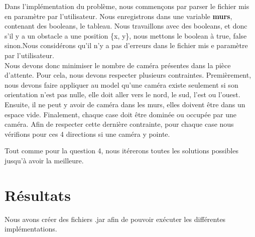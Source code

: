 \documentclass{article}
\begin{document}
Dans l'implémentation du problème, nous commençons par parser le fichier mis en paramètre par l'utilisateur. Nous enregistrons dans une variable \textbf{murs}, contenant des booleans, le tableau. Nous travaillons avec des booleans, et donc s'il y a un obstacle a une position \{x, y\}, nous mettons le boolean à true, false sinon.Nous considérons qu'il n'y a pas d'erreurs dans le fichier mis e paramètre par l'utilisateur.\\

Nous devons donc minimiser le nombre de caméra présentes dans la pièce d'attente. Pour cela, nous devons respecter plusieurs contraintes. Premièrement, nous devons faire appliquer au model qu'une caméra existe seulement si son orientation n'est pas nulle, elle doit aller vers le nord, le sud, l'est ou l'ouest. Ensuite, il ne peut y avoir de caméra dans les murs, elles doivent être dans un espace vide. Finalement, chaque case doit être dominée ou occupée par une caméra. Afin de respecter cette dernière contrainte, pour chaque case nous vérifions pour ces 4 directions si une caméra y pointe.

Tout comme pour la question 4, nous itérerons toutes les solutions possibles jusqu'à avoir la meilleure.

\section{Résultats}
Nous avons créer des fichiers .jar afin de pouvoir exécuter les différentes implémentations.
\end{document}
